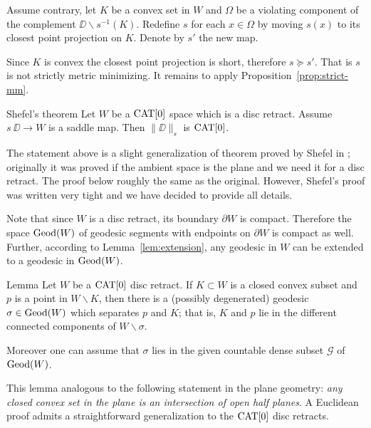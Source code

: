 \documentclass[a4paper,10pt]{amsart}
\begin{document}
Assume contrary, let $K$ be a convex set in $W$
and $\Omega$ be a violating component of the complement $\DD\backslash s^{-1}(K)$.
Redefine $s$ for each $x\in\Omega$ by moving 
$s(x)$ to its closest point projection on $K$.
Denote by $s'$ the new map.

Since $K$ is convex the closest point projection is short,
therefore $s\succcurlyeq s'$.
That is $s$ is not strictly metric minimizing.
It remains to apply Proposition~\ref{prop:strict-mm}.
\qeds

 






\begin{thm}{Shefel's theorem}\label{thm:shefel-2D}
Let $W$ be a $\mathop{\rm CAT}\nolimits[0]$ space which is a disc retract.
Assume $s\:\DD\to W$ is a saddle map. 
Then $\|\DD\|_s$ is $\mathop{\rm CAT}\nolimits[0]$.
\end{thm}

The statement above is a slight generalization of theorem proved by Shefel in \cite{shefel-2D};
originally it was proved if the ambient space is the plane and we need it for a disc retract.
The proof below roughly the same as the original.
However, Shefel's proof was written very tight
and we have decided to provide all details.


Note that since $W$ is a disc retract, its boundary $\partial W$ is compact. Therefore
the space $\mathop{\rm Geod}\nolimits(W)$ of geodesic segments with endpoints on $\partial W$ is compact as well.
Further, according to Lemma~\ref{lem:extension}, any geodesic in $W$ can be extended to a geodesic in $\mathop{\rm Geod}\nolimits(W)$.

\begin{thm}{Lemma}\label{lem:sepbygeo}\label{lem:saddle-crit}
Let $W$ be a $\mathop{\rm CAT}\nolimits[0]$  disc retract. If $K\subset W$ is a closed convex subset and $p$ is a
point in $W\backslash K$, then there is a (possibly degenerated) geodesic $\sigma\in\mathop{\rm Geod}\nolimits(W)$ which separates $p$ and $K$;
that is, $K$ and $p$ lie in the different connected components of $W\backslash \sigma$.

Moreover one can assume that $\sigma$ lies in the given countable dense subset $\mathcal{G}$
of $\mathop{\rm Geod}\nolimits(W)$.
\end{thm}

This lemma analogous to the following statement in the plane geometry: \emph{any closed convex set in the plane is an intersection of open half planes}.
A Euclidean proof admits a straightforward generalization to the $\mathop{\rm CAT}\nolimits[0]$ disc retracts.
\end{document}
